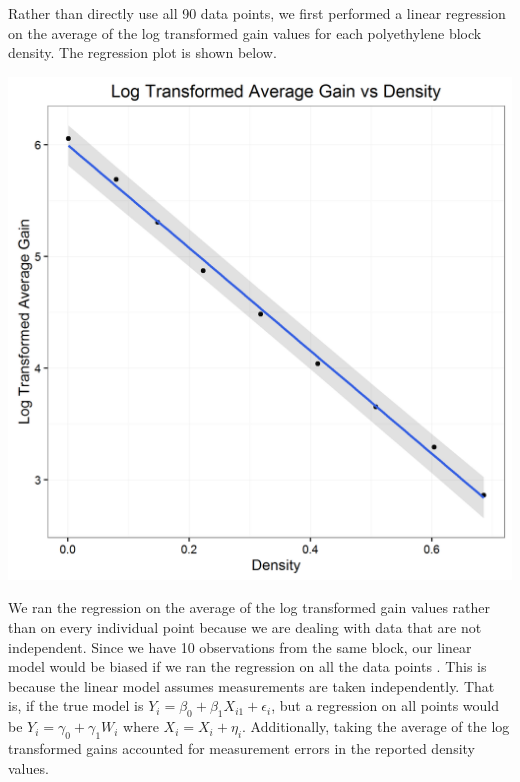 \documentclass[11pt]{article} %
\begin{document}
Rather than directly use all 90 data points, we first performed a linear regression on the average of the log transformed gain values for each polyethylene block density. The regression plot is shown below.
\begin{center}\includegraphics[scale=0.6]{logGainDensity.png}\end{center}

We ran the regression on the average of the log transformed gain values rather than on every individual point because we are dealing with data that are not independent. Since we have 10 observations from the same block, our linear model would be biased if we ran the regression on all the data points . This is because the linear model assumes measurements are taken independently. That is, if the true model is $Y_i=\beta_0 +\beta_1X_{i1}+\epsilon_i$, but a regression on all points would be $Y_i=\gamma_0+\gamma_1W_i$ where $X_i=X_i+\eta_i$. Additionally, taking the average of the log transformed gains accounted for measurement errors in the reported density values.
\end{document}
